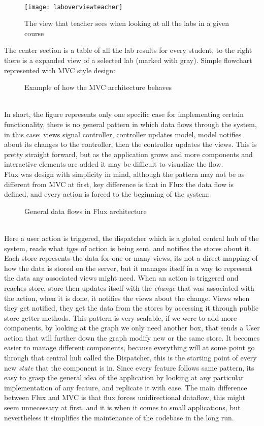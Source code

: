 \\
\begin{figure}[h]
  {\texttt{[image: laboverviewteacher]}}
  \caption{The view that teacher sees when looking at all the labs in a given course}
  \label{fig:laboverviewteacher}
\end{figure}
\newpage
The center section is a table of all the lab results for every student, to the right there is a expanded view of a selected lab (marked with gray).
Simple flowchart represented with MVC style design:
\begin{figure}[h]
\centering

\caption{Example of how the MVC architecture behaves}
\end{figure}
\\In short, the figure represents only one specific case for implementing certain functionality, there is no general pattern in which data flows through the system, in this case: views signal controller, controller updates model, model notifies about its changes to the controller, then the controller updates the views. This is pretty straight forward, but as the application grows and more components and interactive elements are added it may be difficult to visualize the flow.
\\Flux was design with simplicity in mind, although the pattern may not be as different from MVC at first, key difference is that in Flux the data flow is defined, and every action is forced to the beginning of the system:
\begin{figure}[h]
\centering
\scalebox{0.9}{}
\caption{General data flows in Flux architecture}
\end{figure}
\\Here a user action is triggered, the dispatcher which is a global central hub of the system, reads what \emph{type} of action is being sent, and notifies the stores about it. Each store represents the data for one or many views, its not a direct mapping of how the data is stored on the server, but it manages itself in a way to represent the data any associated views might need. When an action is triggered and reaches store, store then updates itself with the \emph{change} that was associated with the action, when it is done, it notifies the views about the change. Views when they get notified, they get the data from the stores by accessing it through public store getter methods.
This pattern is very scalable, if we were to add more components, by looking at the graph we only need another box, that sends a User action that will further down the graph modify new or the same store. It becomes easier to manage different components, because everything will at some point go through that central hub called the Dispatcher, this is the starting point of every new \emph{state} that the component is in. Since every feature follows same pattern, its easy to grasp the general idea of the application by looking at any particular implementation of any feature, and replicate it with ease. The main difference between Flux and MVC is that flux forces unidirectional dataflow, this might seem unnecessary at first, and it is when it comes to small applications, but nevertheless it simplifies the maintenance of the codebase in the long run.

